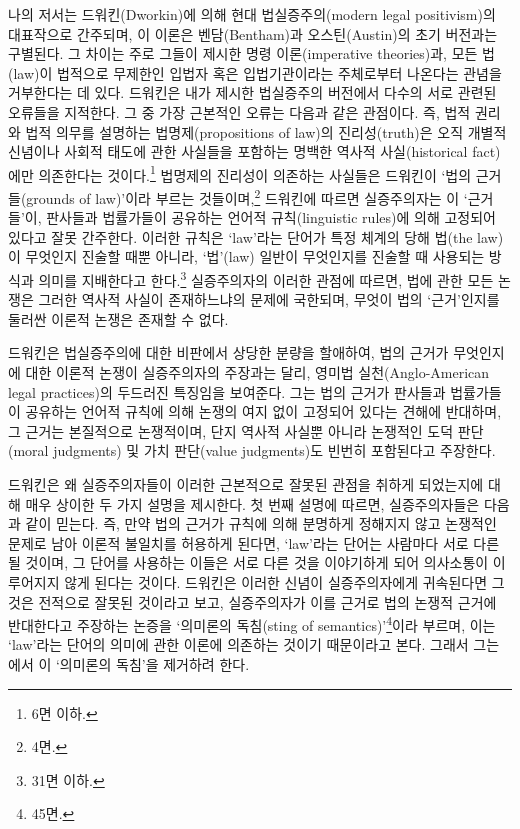 나의 저서는 드워킨(Dworkin)에 의해 현대 법실증주의(modern legal
positivism)의 대표작으로 간주되며, 이 이론은 벤담(Bentham)과
오스틴(Austin)의 초기 버전과는 구별된다. 그 차이는 주로 그들이 제시한
명령 이론(imperative theories)과, 모든 법(law)이 법적으로 무제한인
입법자 혹은 입법기관이라는 주체로부터 나온다는 관념을 거부한다는 데
있다. 드워킨은 내가 제시한 법실증주의 버전에서 다수의 서로 관련된
오류들을 지적한다. 그 중 가장 근본적인 오류는 다음과 같은 관점이다. 즉,
법적 권리와 법적 의무를 설명하는 법명제(propositions of law)의
진리성(truth)은 오직 개별적 신념이나 사회적 태도에 관한 사실들을
포함하는 명백한 역사적 사실(historical fact)에만 의존한다는
것이다.\footnote{ 6면 이하.} 법명제의 진리성이 의존하는
사실들은 드워킨이 `법의 근거들(grounds of law)'이라 부르는
것들이며,\footnote{ 4면.} 드워킨에 따르면 실증주의자는 이
`근거들'이, 판사들과 법률가들이 공유하는 언어적 규칙(linguistic rules)에
의해 고정되어 있다고 잘못 간주한다. 이러한 규칙은 `law'라는 단어가 특정
체계의 당해 법(the law)이 무엇인지 진술할 때뿐 아니라, `법'(law) 일반이
무엇인지를 진술할 때 사용되는 방식과 의미를 지배한다고 한다.\footnote{
  31면 이하.} 실증주의자의 이러한 관점에 따르면, 법에 관한 모든 논쟁은
그러한 역사적 사실이 존재하느냐의 문제에 국한되며, 무엇이 법의
`근거'인지를 둘러싼 이론적 논쟁은 존재할 수 없다.

드워킨은 법실증주의에 대한 비판에서 상당한 분량을 할애하여, 법의 근거가
무엇인지에 대한 이론적 논쟁이 실증주의자의 주장과는 달리, 영미법
실천(Anglo-American legal practices)의 두드러진 특징임을 보여준다. 그는
법의 근거가 판사들과 법률가들이 공유하는 언어적 규칙에 의해 논쟁의 여지
없이 고정되어 있다는 견해에 반대하며, 그 근거는 본질적으로 논쟁적이며,
단지 역사적 사실뿐 아니라 논쟁적인 도덕 판단(moral judgments) 및 가치
판단(value judgments)도 빈번히 포함된다고 주장한다.

드워킨은 왜 실증주의자들이 이러한 근본적으로 잘못된 관점을 취하게
되었는지에 대해 매우 상이한 두 가지 설명을 제시한다. 첫 번째 설명에
따르면, 실증주의자들은 다음과 같이 믿는다. 즉, 만약 법의 근거가 규칙에
의해 분명하게 정해지지 않고 논쟁적인 문제로 남아 이론적 불일치를
허용하게 된다면, `law'라는 단어는 사람마다 서로 다른  될 것이며, 그 단어를 사용하는 이들은 서로 다른 것을
이야기하게 되어 의사소통이 이루어지지 않게 된다는 것이다. 드워킨은
이러한 신념이 실증주의자에게 귀속된다면 그것은 전적으로 잘못된 것이라고
보고, 실증주의자가 이를 근거로 법의 논쟁적 근거에 반대한다고 주장하는
논증을 `의미론의 독침(sting of semantics)'\footnote{ 45면.}이라
부르며, 이는 `law'라는 단어의 의미에 관한 이론에 의존하는 것이기
때문이라고 본다. 그래서 그는 에서 이 `의미론의
독침'을 제거하려 한다.

